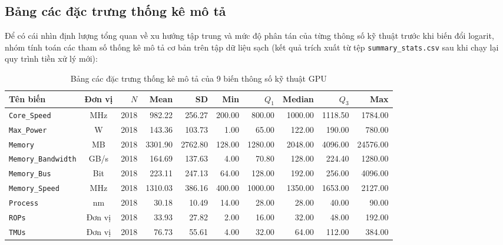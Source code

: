     \subsection{Bảng các đặc trưng thống kê mô tả}
        Để có cái nhìn định lượng tổng quan về xu hướng tập trung và mức độ phân tán của từng thông số kỹ thuật trước khi biến đổi logarit, nhóm tính toán các tham số thống kê mô tả cơ bản trên tập dữ liệu sạch (kết quả trích xuất từ tệp \texttt{summary\_stats.csv} sau khi chạy lại quy trình tiền xử lý mới):

        \begin{table}[H]
            \centering
            \footnotesize
            \renewcommand{\arraystretch}{1.35}
            \begin{tabular}{|l|c|r|r|r|r|r|r|r|r|}
                \hline
                \textbf{Tên biến} & \textbf{Đơn vị} & \textbf{$N$} & \textbf{Mean} & \textbf{SD} & \textbf{Min} & \textbf{$Q_1$} & \textbf{Median} & \textbf{$Q_3$} & \textbf{Max} \\
                \hline
                \texttt{Core\_Speed} & MHz & 2018 & 982.22 & 256.27 & 200.00 & 800.00 & 1000.00 & 1118.50 & 1784.00 \\
                \hline
                \texttt{Max\_Power} & W & 2018 & 143.36 & 103.73 & 1.00 & 65.00 & 122.00 & 190.00 & 780.00 \\
                \hline
                \texttt{Memory} & MB & 2018 & 3301.90 & 2762.80 & 128.00 & 1280.00 & 2048.00 & 4096.00 & 24576.00 \\
                \hline
                \texttt{Memory\_Bandwidth} & GB/s & 2018 & 164.69 & 137.63 & 4.00 & 70.80 & 128.00 & 224.40 & 1280.00 \\
                \hline
                \texttt{Memory\_Bus} & Bit & 2018 & 223.11 & 247.13 & 64.00 & 128.00 & 192.00 & 256.00 & 4096.00 \\
                \hline
                \texttt{Memory\_Speed} & MHz & 2018 & 1310.03 & 386.16 & 400.00 & 1000.00 & 1350.00 & 1653.00 & 2127.00 \\
                \hline
                \texttt{Process} & nm & 2018 & 30.18 & 10.49 & 14.00 & 28.00 & 28.00 & 40.00 & 90.00 \\
                \hline
                \texttt{ROPs} & Đơn vị & 2018 & 33.93 & 27.82 & 2.00 & 16.00 & 32.00 & 48.00 & 192.00 \\
                \hline
                \texttt{TMUs} & Đơn vị & 2018 & 76.73 & 55.61 & 4.00 & 32.00 & 64.00 & 112.00 & 384.00 \\
                \hline
            \end{tabular}
            \caption{Bảng các đặc trưng thống kê mô tả của 9 biến thông số kỹ thuật GPU}
            \label{tab:dac_trung_thong_ke}
        \end{table}

